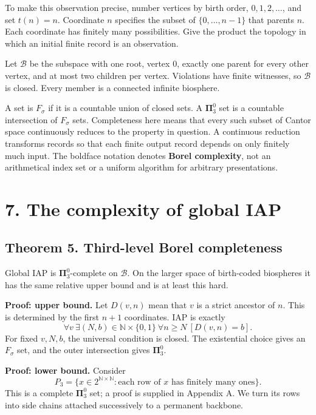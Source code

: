 \documentclass[
  11pt,
  letterpaper,
]{article}
\begin{document}
To make this observation precise, number vertices by birth order,
\(0,1,2,\ldots\), and set \(t(n)=n\). Coordinate \(n\) specifies the
subset of \(\{0,\ldots,n-1\}\) that parents \(n\). Each coordinate has
finitely many possibilities. Give the product the topology in which an
initial finite record is an observation.

Let \(\mathcal B\) be the subspace with one root, vertex \(0\), exactly
one parent for every other vertex, and at most two children per vertex.
Violations have finite witnesses, so \(\mathcal B\) is closed. Every
member is a connected infinite biosphere.

A set is \(F_\sigma\) if it is a countable union of closed sets. A
\(\boldsymbol{\Pi}^0_3\) set is a countable intersection of \(F_\sigma\)
sets. Completeness here means that every such subset of Cantor space
continuously reduces to the property in question. A continuous reduction
transforms records so that each finite output record depends on only
finitely much input. The boldface notation denotes \textbf{Borel
complexity}, not an arithmetical index set or a uniform algorithm for
arbitrary presentations.

\section{7. The complexity of global
IAP}\label{the-complexity-of-global-iap}

\subsection{Theorem 5. Third-level Borel
completeness}\label{theorem-5.-third-level-borel-completeness}

Global IAP is \(\boldsymbol{\Pi}^0_3\)-complete on \(\mathcal B\). On
the larger space of birth-coded biospheres it has the same relative
upper bound and is at least this hard.

\textbf{Proof: upper bound.} Let \(D(v,n)\) mean that \(v\) is a strict
ancestor of \(n\). This is determined by the first \(n+1\) coordinates.
IAP is exactly \[
 \forall v\ \exists(N,b)\in\mathbb N\times\{0,1\}\
                   \forall n\geq N\ [D(v,n)=b].
\] For fixed \(v,N,b\), the universal condition is closed. The
existential choice gives an \(F_\sigma\) set, and the outer intersection
gives \(\boldsymbol{\Pi}^0_3\).

\textbf{Proof: lower bound.} Consider \[
 P_3=\{x\in2^{\mathbb N\times\mathbb N}:
                  \text{each row of }x\text{ has finitely many ones}\}.
\] This is a complete \(\boldsymbol{\Pi}^0_3\) set; a proof is supplied
in Appendix A. We turn its rows into side chains attached successively
to a permanent backbone.
\end{document}
